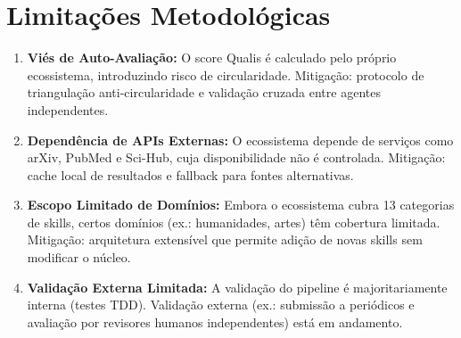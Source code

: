 \section{Limitações Metodológicas}

\begin{enumerate}
  \item \textbf{Viés de Auto-Avaliação:} O score Qualis é calculado pelo próprio ecossistema, introduzindo risco de circularidade. Mitigação: protocolo de triangulação anti-circularidade e validação cruzada entre agentes independentes.
  \item \textbf{Dependência de APIs Externas:} O ecossistema depende de serviços como arXiv, PubMed e Sci-Hub, cuja disponibilidade não é controlada. Mitigação: cache local de resultados e fallback para fontes alternativas.
  \item \textbf{Escopo Limitado de Domínios:} Embora o ecossistema cubra 13 categorias de skills, certos domínios (ex.: humanidades, artes) têm cobertura limitada. Mitigação: arquitetura extensível que permite adição de novas skills sem modificar o núcleo.
  \item \textbf{Validação Externa Limitada:} A validação do pipeline é majoritariamente interna (testes TDD). Validação externa (ex.: submissão a periódicos e avaliação por revisores humanos independentes) está em andamento.
\end{enumerate}

\newpage
